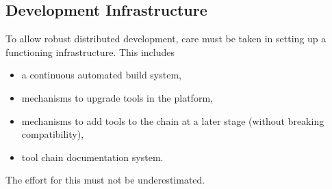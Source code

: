 \documentclass{template/openetcs_article}
\begin{document}

\subsection{Development Infrastructure}

To allow robust distributed development, care must be taken in setting up a functioning infrastructure.  This includes 
\begin{itemize}
\item a continuous automated build system, 
\item mechanisms to upgrade tools in the platform, 
\item mechanisms to add tools to the chain at a later stage (without breaking compatibility),
\item tool chain documentation system. 
\end{itemize}
 The effort for this must not be underestimated.
\end{document}
